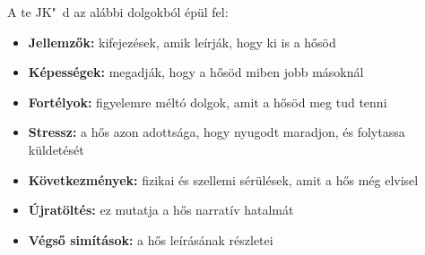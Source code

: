 A te JK"~d az alábbi dolgokból épül fel:

\begin{itemize}
    \item \textbf{Jellemzők:} kifejezések, amik leírják, hogy ki is a hősöd
    \item \textbf{Képességek:} megadják, hogy a hősöd miben jobb másoknál
    \item \textbf{Fortélyok:} figyelemre méltó dolgok, amit a hősöd meg tud tenni
    \item \textbf{Stressz:} a hős azon adottsága, hogy nyugodt maradjon, és folytassa küldetését
    \item \textbf{Következmények:} fizikai és szellemi sérülések, amit a hős még elvisel
    \item \textbf{Újratöltés:} ez mutatja a hős narratív hatalmát
    \item \textbf{Végső simítások:} a hős leírásának részletei
\end{itemize}
